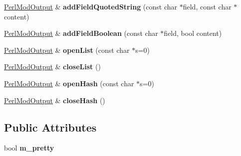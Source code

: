 \begin{DoxyCompactItemize}
\item 
\mbox{\label{class_perl_mod_output_a4aa4d03f69c35b34fb6d67c82882de74}} 
\mbox{\hyperlink{class_perl_mod_output}{Perl\+Mod\+Output}} \& {\bfseries add\+Field\+Quoted\+String} (const char $\ast$field, const char $\ast$content)
\item 
\mbox{\label{class_perl_mod_output_a1757cf0f9469290547d8b649801c1e72}} 
\mbox{\hyperlink{class_perl_mod_output}{Perl\+Mod\+Output}} \& {\bfseries add\+Field\+Boolean} (const char $\ast$field, bool content)
\item 
\mbox{\label{class_perl_mod_output_a98d9e21faa376f774072ded1b97f7b72}} 
\mbox{\hyperlink{class_perl_mod_output}{Perl\+Mod\+Output}} \& {\bfseries open\+List} (const char $\ast$s=0)
\item 
\mbox{\label{class_perl_mod_output_a7c2d76ccf51197fd1a0db53c0179f14c}} 
\mbox{\hyperlink{class_perl_mod_output}{Perl\+Mod\+Output}} \& {\bfseries close\+List} ()
\item 
\mbox{\label{class_perl_mod_output_ad3f263a6a01a737ea0f48f1301a0c63b}} 
\mbox{\hyperlink{class_perl_mod_output}{Perl\+Mod\+Output}} \& {\bfseries open\+Hash} (const char $\ast$s=0)
\item 
\mbox{\label{class_perl_mod_output_a105173f8b051fdea4d34c6a161792b5f}} 
\mbox{\hyperlink{class_perl_mod_output}{Perl\+Mod\+Output}} \& {\bfseries close\+Hash} ()
\end{DoxyCompactItemize}
\subsection*{Public Attributes}
\begin{DoxyCompactItemize}
\item 
\mbox{\label{class_perl_mod_output_a814c200c15b3842ff2671f28a69db498}} 
bool {\bfseries m\+\_\+pretty}
\end{DoxyCompactItemize}
